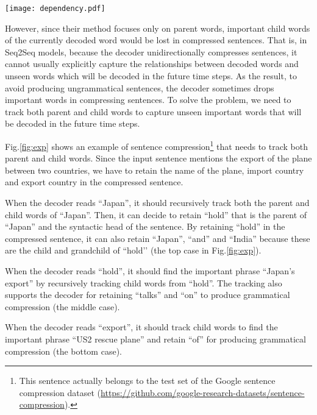 \documentclass[letterpaper]{article} \usepackage{aaai20}  \usepackage{times}  \usepackage{helvet} \usepackage{courier}  \usepackage[hyphens]{url}  \usepackage{graphicx} \urlstyle{rm} \def\UrlFont{\rm}  \usepackage{graphicx}  \frenchspacing  \setlength{\pdfpagewidth}{8.5in}  \setlength{\pdfpageheight}{11in}  \usepackage{tabu}
\begin{document}
\begin{figure*}[t]
\centering
\texttt{[image: dependency.pdf]}
\caption{An example sentence and its dependency tree during the decoding process.
The gray words represent deleted words, and the words in black frames are currently decoded words.
Already decoded words are underlined.
The tracking of parent nodes is represented as blue edges, and that of child nodes is represented as red edges.
The bold words represent the important words in this sentence.\label{fig:exp}}
\end{figure*}

However, since their method focuses only on parent words, important child words of the currently decoded word would be lost in compressed sentences. That is, in Seq2Seq models, because the decoder unidirectionally compresses sentences,  it cannot usually explicitly capture the relationships between decoded words and unseen words which will be decoded in the future time steps.
As the result, to avoid producing ungrammatical sentences, the decoder sometimes drops important words in compressing sentences.
To solve the problem, we need to track both parent and child words to capture unseen important words that will be decoded in the future time steps.

Fig.\ref{fig:exp} shows an example of sentence compression\footnote{This sentence actually belongs to the test set of the Google sentence compression dataset (\url{https://github.com/google-research-datasets/sentence-compression}).} that needs to track both parent and child words.
Since the input sentence mentions the export of the plane between two countries, we have to retain the name of the plane, import country and export country in the compressed sentence.

When the decoder reads ``Japan'', it should recursively track both the parent and child words of ``Japan''. Then, it can decide to retain ``hold'' that is the parent of ``Japan'' and the syntactic head of the sentence. By retaining ``hold'' in the compressed sentence, it can also retain ``Japan'', ``and'' and ``India'' because these are the child and grandchild of ``hold’' (the top case in Fig.\ref{fig:exp}).

When the decoder reads ``hold'', it should find the important phrase ``Japan's
export'' by recursively tracking child words from ``hold''. The tracking also supports the decoder for retaining ``talks'' and ``on'' to produce grammatical compression (the middle case).

When the decoder reads ``export'', it should track child words to find the important phrase ``US2 rescue plane'' and retain ``of'' for producing grammatical compression (the bottom case). 
\end{document}
